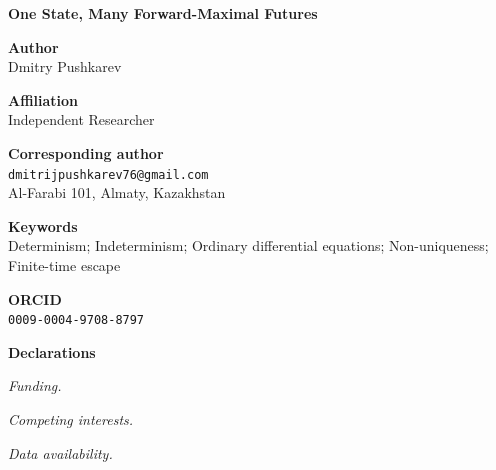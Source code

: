 \documentclass[12pt]{article}
\begin{document}
\raggedright

\begin{center}
  {\Large\bfseries One State, Many Forward-Maximal Futures}
\end{center}

\bigskip

\noindent\textbf{Author}\\
Dmitry Pushkarev

\medskip

\noindent\textbf{Affiliation}\\
Independent Researcher

\medskip

\noindent\textbf{Corresponding author}\\
\texttt{dmitrijpushkarev76@gmail.com}\\
Al-Farabi 101, Almaty, Kazakhstan

\medskip

\noindent\textbf{Keywords}\\
Determinism; Indeterminism; Ordinary differential equations; Non-uniqueness;
Finite-time escape

\medskip

\noindent\textbf{ORCID}\\
\texttt{0009-0004-9708-8797}

\bigskip

\noindent\textbf{Declarations}

\medskip

\noindent\emph{Funding.} %

\noindent\emph{Competing interests.} %

\noindent\emph{Data availability.} %
\end{document}

